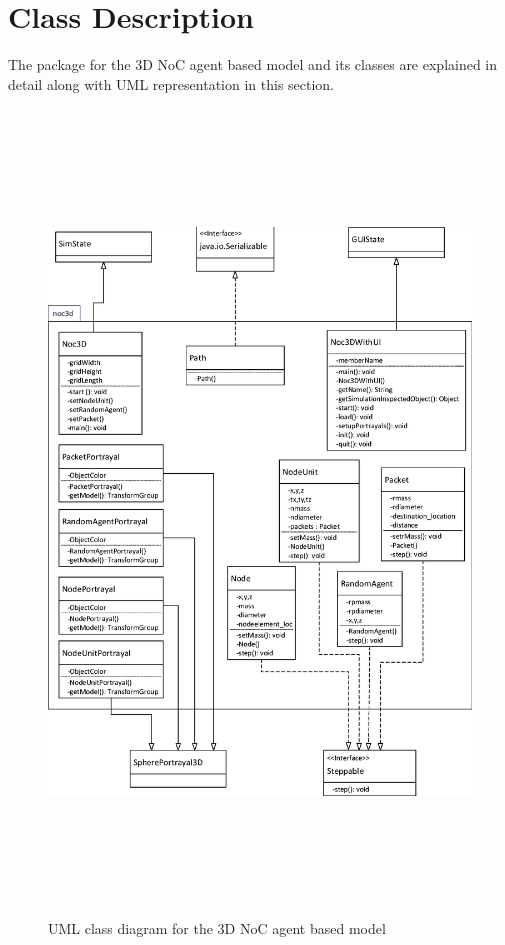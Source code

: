 \section{Class Description}
\vspace{5mm}
The package for the 3D NoC agent based model and its classes are explained in detail along with UML representation in this section.

\begin{figure}
\centering
\includegraphics[height=8.4in, width=5.6in]{class_diagram.eps}
\caption{UML class diagram for the 3D NoC agent based model}
\label{fig:6.3}
\end{figure} 

